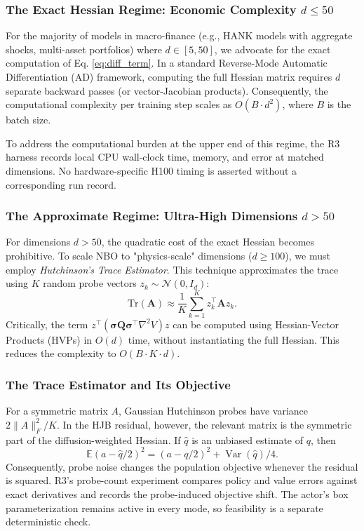 \documentclass[ecta]{econsocart}
\theoremstyle{plain}
\theoremstyle{remark}
\newcommand{\E}{\mathbb{E}}
\newcommand{\diffvec}{\bm{\sigma}}
\begin{document}
\subsubsection{The Exact Hessian Regime: Economic Complexity \texorpdfstring{$d \le 50$}{d <= 50}}
For the majority of models in macro-finance (e.g., HANK models with aggregate shocks, multi-asset portfolios) where $d \in [5, 50]$, we advocate for the exact computation of Eq. \eqref{eq:diff_term}.
In a standard Reverse-Mode Automatic Differentiation (AD) framework, computing the full Hessian matrix requires $d$ separate backward passes (or vector-Jacobian products). Consequently, the computational complexity per training step scales as $O(B \cdot d^2)$, where $B$ is the batch size.

To address the computational burden at the upper end of this regime, the R3 harness records local CPU wall-clock time, memory, and error at matched dimensions. No hardware-specific H100 timing is asserted without a corresponding run record.

\subsubsection{The Approximate Regime: Ultra-High Dimensions \texorpdfstring{$d > 50$}{d > 50}}
For dimensions $d > 50$, the quadratic cost of the exact Hessian becomes prohibitive. To scale NBO to "physics-scale" dimensions ($d \ge 100$), we must employ \textit{Hutchinson's Trace Estimator}. This technique approximates the trace using $K$ random probe vectors $z_k \sim \mathcal{N}(0, I_d)$:
\begin{equation}
\label{eq:hutchinson}
    \text{Tr}(\bm{A}) \approx \frac{1}{K} \sum_{k=1}^K z_k^\top \bm{A} z_k.
\end{equation}
Critically, the term $z^\top (\diffvec \bm{Q} \diffvec^\top \nabla^2 V) z$ can be computed using Hessian-Vector Products (HVPs) in $O(d)$ time, without instantiating the full Hessian. This reduces the complexity to $O(B \cdot K \cdot d)$.

\subsubsection{The Trace Estimator and Its Objective}
For a symmetric matrix $A$, Gaussian Hutchinson probes have variance $2\|A\|_F^2/K$. In the HJB residual, however, the relevant matrix is the symmetric part of the diffusion-weighted Hessian. If $\widehat q$ is an unbiased estimate of $q$, then
\[
\E(a-\widehat q/2)^2=(a-q/2)^2+\operatorname{Var}(\widehat q)/4.
\]
Consequently, probe noise changes the population objective whenever the residual is squared. R3's probe-count experiment compares policy and value errors against exact derivatives and records the probe-induced objective shift. The actor's box parameterization remains active in every mode, so feasibility is a separate deterministic check.
\end{document}
